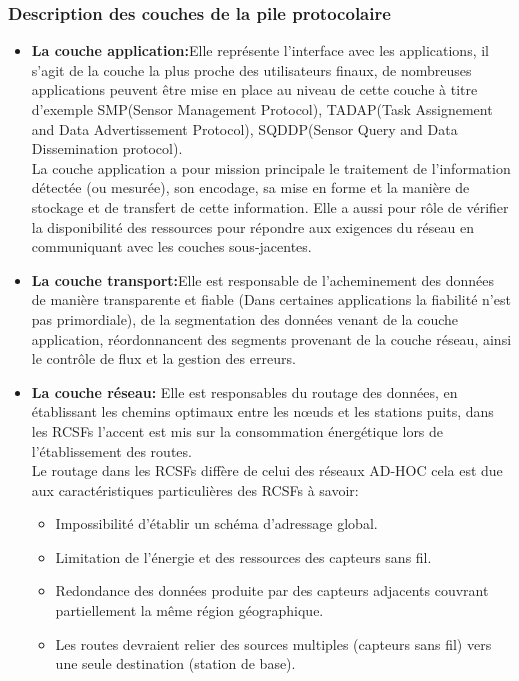 \subsubsection{Description des couches de la pile protocolaire}
\begin{itemize}
\item \textbf{La couche application:}Elle représente l'interface avec les applications, il s'agit de la couche la plus proche des utilisateurs finaux, de nombreuses applications peuvent être mise en place au niveau de cette couche à titre d'exemple SMP(Sensor Management Protocol), TADAP(Task Assignement and Data Advertissement Protocol), SQDDP(Sensor Query and Data Dissemination protocol).\\
  La couche application a pour mission principale le traitement de l'information détectée (ou mesurée), son encodage, sa mise en forme et la manière de stockage et de transfert de cette information. Elle a aussi pour rôle de vérifier la disponibilité des ressources pour répondre aux exigences du réseau en communiquant avec les couches sous-jacentes.\\
  
  \item \textbf{La couche transport:}Elle est  responsable de l'acheminement des données de manière transparente et fiable (Dans certaines applications la fiabilité n'est pas primordiale), de la segmentation des données venant de la couche application, réordonnancent des segments provenant de la couche réseau, ainsi le contrôle de flux et la gestion des erreurs. 
  
  
  \item \textbf{La couche réseau:} Elle est responsables du routage des données, en établissant les chemins optimaux entre les nœuds et les stations puits, dans les RCSFs l'accent est mis sur la consommation énergétique lors de l'établissement des routes.\\
  Le routage dans les RCSFs diffère de celui des réseaux AD-HOC cela est due aux caractéristiques particulières des RCSFs à savoir:
  \begin{itemize}
  \item Impossibilité d'établir un schéma d'adressage global.
  \item	Limitation de l'énergie et des ressources des capteurs sans fil.
 \item Redondance des données produite par des capteurs adjacents couvrant partiellement la même région géographique.
 \item Les routes devraient relier des sources multiples (capteurs sans fil) vers une seule destination (station de base).\\
  \end{itemize}
  

\end{itemize}

